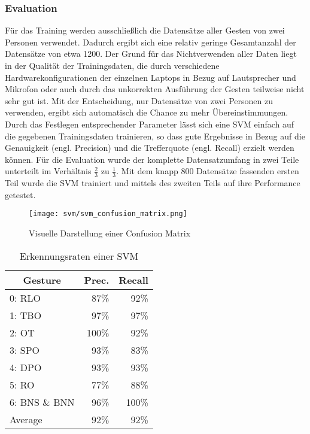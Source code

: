\subsubsection{Evaluation}
Für das Training werden ausschließlich die Datensätze aller Gesten von zwei Personen verwendet.
Dadurch ergibt sich eine relativ geringe Gesamtanzahl der Datensätze von etwa 1200.
Der Grund für das Nichtverwenden aller Daten liegt in der Qualität der Trainingsdaten, die durch verschiedene Hardwarekonfigurationen der einzelnen Laptops in Bezug auf Lautsprecher und Mikrofon oder auch durch das unkorrekten Ausführung der Gesten teilweise nicht sehr gut ist.
Mit der Entscheidung, nur Datensätze von zwei Personen zu verwenden, ergibt sich automatisch die Chance zu mehr Übereinstimmungen.
Durch das Festlegen entsprechender Parameter lässt sich eine \ac{SVM} einfach auf die gegebenen Trainingsdaten trainieren, so dass gute Ergebnisse in Bezug auf die Genauigkeit (engl. Precision) und die Trefferquote (engl. Recall) erzielt werden können.
Für die Evaluation wurde der komplette Datensatzumfang in zwei Teile unterteilt im Verhältnis $\frac{2}{3}$ zu $\frac{1}{3}$.
Mit dem knapp 800 Datensätze fassenden ersten Teil wurde die \ac{SVM} trainiert und mittels des zweiten Teils auf ihre Performance getestet.
\begin{figure}[htbp] \centering
    \texttt{[image: svm/svm\_confusion\_matrix.png]}
    \caption{Visuelle Darstellung einer Confusion Matrix}
    \label{fig:svm_confusion_matrix}
\end{figure}

\begin{table}[h]
\centering
\begin{tabular}{lrr}
\hline
 \multicolumn{1}{c}{\textbf{Gesture}} & \multicolumn{1}{c}{\textbf{Prec.}} & \multicolumn{1}{c}{\textbf{Recall}} \\
 \hline
  0: \ac{RLO} & 87\% & 92\% \\
 \hline
  1: \ac{TBO} & 97\% & 97\% \\
 \hline
  2: \ac{OT} & 100\% & 92\% \\
 \hline
  3: \ac{SPO} & 93\% & 83\% \\
 \hline
  4: \ac{DPO} & 93\% & 93\% \\
 \hline
  5: \ac{RO} & 77\% & 88\% \\
 \hline
  6: \ac{BNS} \& \ac{BNN} & 96\% & 100\% \\
 \hline
  Average & 92\% & 92\% \\
 \hline
\end{tabular}
\caption[Erkennungsraten einer SVM]{Erkennungsraten einer SVM}
\label{tab:svm_performance}
\end{table}

